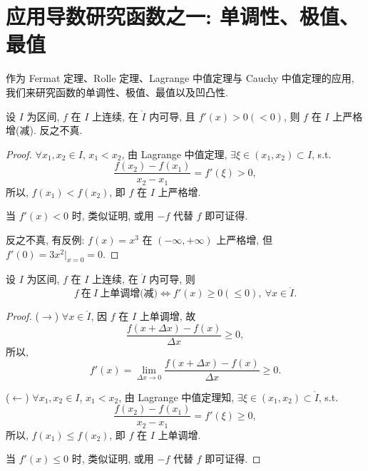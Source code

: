 \section{应用导数研究函数之一: 单调性、极值、最值}\label{sec:3.5}

作为 Fermat 定理、Rolle 定理、Lagrange 中值定理与 Cauchy 中值定理的应用, 我们来研究函数的单调性、极值、最值以及凹凸性.

\begin{theorem}\label{thm:3.5.1}
设 $I$ 为区间, $f$ 在 $I$ 上连续, 在 $\mathring{I}$ 内可导, 且 $f'(x)>0(<0)$, 则 $f$ 在 $I$ 上严格增(减). 反之不真.
\end{theorem}

\begin{proof}
$\forall x_{1},x_{2}\in I$, $x_{1}<x_{2}$, 由 Lagrange 中值定理, $\exists\xi\in(x_{1},x_{2})\subset I$, s.t.
\[
\frac{f(x_{2})-f(x_{1})}{x_{2}-x_{1}}=f'(\xi)>0,
\]
所以, $f(x_{1})<f(x_{2})$, 即 $f$ 在 $I$ 上严格增.

当 $f'(x)<0$ 时, 类似证明, 或用 $-f$ 代替 $f$ 即可证得.

反之不真, 有反例: $f(x)=x^{3}$ 在 $(-\infty,+\infty)$ 上严格增, 但 $f'(0)=3x^{2}|_{x=0}=0$.
\end{proof}

\begin{theorem}\label{thm:3.5.2}
设 $I$ 为区间, $f$ 在 $I$ 上连续, 在 $\mathring{I}$ 内可导, 则
\[
f\ \text{在}\ I\ \text{上单调增(减)}\Longleftrightarrow f'(x)\geqslant 0(\leqslant 0),\ \forall x\in\mathring{I}.
\]
\end{theorem}

\begin{proof}
($\rightarrow$) $\forall x\in\mathring{I}$, 因 $f$ 在 $I$ 上单调增, 故
\[
\frac{f(x+\Delta x)-f(x)}{\Delta x}\geqslant 0,
\]
所以,
\[
f'(x)=\lim_{\Delta x\to 0}\frac{f(x+\Delta x)-f(x)}{\Delta x}\geqslant 0.
\]

($\leftarrow$) $\forall x_{1},x_{2}\in I$, $x_{1}<x_{2}$, 由 Lagrange 中值定理知, $\exists\xi\in(x_{1},x_{2})\subset\mathring{I}$, s.t.
\[
\frac{f(x_{2})-f(x_{1})}{x_{2}-x_{1}}=f'(\xi)\geqslant 0,
\]
所以, $f(x_{1})\leqslant f(x_{2})$, 即 $f$ 在 $I$ 上单调增.

当 $f'(x)\leqslant 0$ 时, 类似证明, 或用 $-f$ 代替 $f$ 即可证得.
\end{proof}

